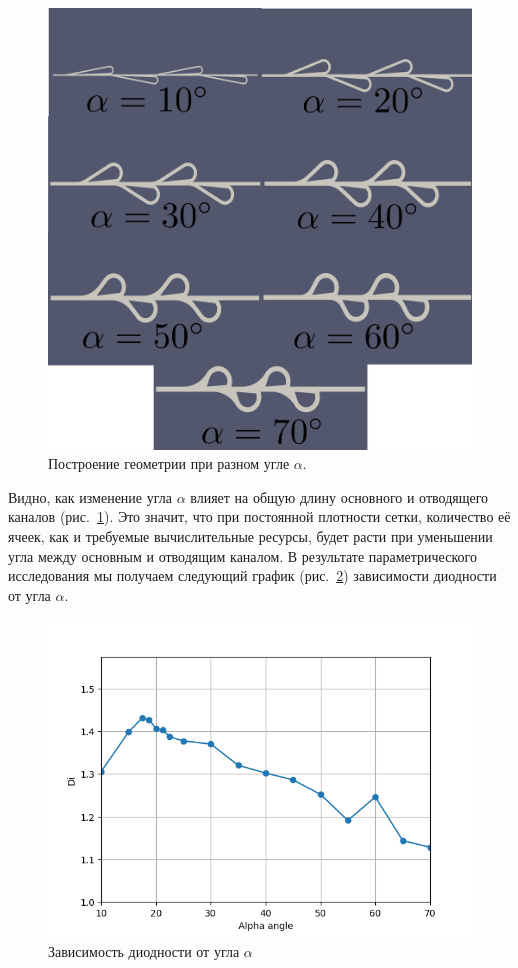 \documentclass[14pt,a4paper]{article}
\begin{document}
         \begin{figure}[H]
             \centering
             \includegraphics[width = 0.7\linewidth]{allAngle}
             \caption{Построение геометрии при разном угле $\alpha$.}
             \label{fig:allAngle}
         \end{figure}
         
         Видно, как изменение угла $\alpha$ влияет на общую длину основного и отводящего каналов (рис.~\ref{fig:allAngle}). Это значит, что при постоянной плотности сетки, количество её ячеек, как и требуемые вычислительные ресурсы, будет расти при уменьшении угла между основным и отводящим каналом. В результате параметрического исследования мы получаем следующий график (рис.~\ref{fig:alphaAngle}) зависимости диодности от угла $ \alpha $.
         
         
         
         
         \begin{figure}[H]
             \centering
             \includegraphics[width = 1\linewidth]{alphaAngle}
             \caption{Зависимость диодности от угла $\alpha$}
             \label{fig:alphaAngle}
         \end{figure}
         
\end{document}
